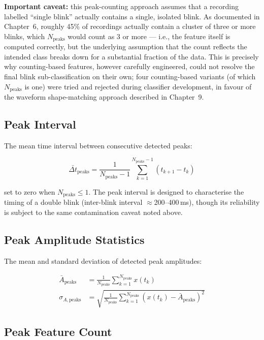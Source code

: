 \textbf{Important caveat:} this peak-counting approach assumes
that a recording labelled ``single blink'' actually contains a
single, isolated blink. As documented in Chapter~6, roughly
45\% of  recordings actually contain a
cluster of three or more blinks, which $N_{\text{peaks}}$
would count as 3 or more --- i.e., the feature itself is
computed correctly, but the underlying assumption that the
count reflects the intended class breaks down for a substantial
fraction of the data. This is precisely why counting-based
features, however carefully engineered, could not resolve the
final blink sub-classification on their own; four
counting-based variants (of which $N_{\text{peaks}}$ is one)
were tried and rejected during classifier development, in
favour of the waveform shape-matching approach described in
Chapter~9.

\subsection{Peak Interval}

The mean time interval between consecutive detected peaks:

\begin{equation}
\bar{\Delta t}_{\text{peaks}} = \frac{1}{N_{\text{peaks}}-1}
\sum_{k=1}^{N_{\text{peaks}}-1} (t_{k+1} - t_k)
\label{eq:peak_interval}
\end{equation}

\noindent set to zero when $N_{\text{peaks}} \leq 1$.
The peak interval is designed to characterise the timing of a
double blink (inter-blink interval $\approx$200--400\,ms),
though its reliability is subject to the same contamination
caveat noted above.

\subsection{Peak Amplitude Statistics}

The mean and standard deviation of detected peak amplitudes:

\begin{align}
\bar{A}_{\text{peaks}} &= \frac{1}{N_{\text{peaks}}}
\sum_{k=1}^{N_{\text{peaks}}} x(t_k)
\label{eq:peak_mean} \\
\sigma_{A,\text{peaks}} &= \sqrt{\frac{1}{N_{\text{peaks}}}
\sum_{k=1}^{N_{\text{peaks}}}
\left(x(t_k) - \bar{A}_{\text{peaks}}\right)^2}
\label{eq:peak_std}
\end{align}

\subsection{Peak Feature Count}

